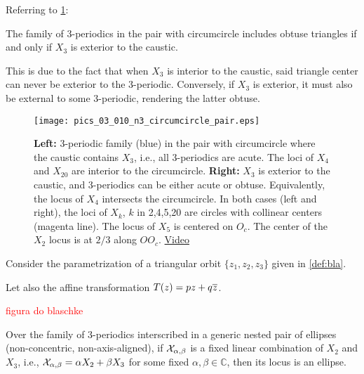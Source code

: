 Referring to  \cref{fig:nonconcentric-circumcircle-circular-loci-right-tris}:

\begin{observation}
The family of 3-periodics in the pair with circumcircle includes obtuse triangles if and only if $X_3$ is exterior to the caustic. \end{observation}

This is due to the fact that when $X_3$ is interior to the caustic, said triangle center can never be exterior to the 3-periodic. Conversely, if $X_3$ is exterior, it must also be external to some 3-periodic, rendering the latter obtuse.

\begin{figure}
    \centering
    \texttt{[image: pics\_03\_010\_n3\_circumcircle\_pair.eps]}
    \caption{\textbf{Left:} 3-periodic family (blue) in the pair with circumcircle where the caustic contains $X_3$, i.e., all 3-periodics are acute. The loci of $X_4$ and $X_{20}$ are interior to the circumcircle. \textbf{Right:} $X_3$ is exterior to the caustic, and 3-periodics can be either acute or obtuse. Equivalently, the locus of $X_4$ intersects the circumcircle. In both cases (left and right), the loci of $X_k$, $k$ in 2,4,5,20 are circles with collinear centers (magenta line). The locus of $X_5$ is centered on $O_c$. The center of the $X_2$ locus is at $2/3$ along $O O_c$. \href{https://youtu.be/HXgJQo2UT_8}{Video}}
    \label{fig:nonconcentric-circumcircle-circular-loci-right-tris}
\end{figure} 


Consider the parametrization of a triangular orbit $\{z_1,z_2,z_3\}$ given in \cref{def:bla}.

Let also the  affine transformation
$T(z)=pz+q\overline z$.

\textcolor{red}{figura do blaschke}

\begin{theorem}
Over the family of 3-periodics interscribed in a generic nested pair of ellipses (non-concentric, non-axis-aligned),
if $\mathcal{X}_{\alpha,\beta}$ is a fixed linear combination of $X_2$ and $X_3$, i.e., $\mathcal{X}_{\alpha,\beta}=\alpha X_2+\beta X_3$ for some fixed $\alpha,\beta\in\mathbb{C}$, then its locus is an ellipse. 
\label{thm:ellipse-locus}
\end{theorem}


